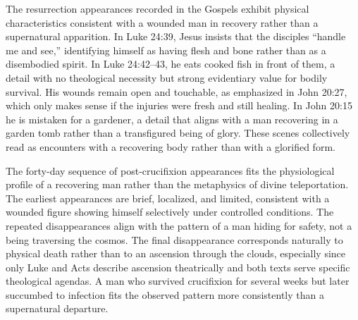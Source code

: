 The resurrection appearances recorded in the Gospels exhibit physical characteristics consistent with a wounded man in recovery rather than a supernatural apparition.
In Luke 24:39, Jesus insists that the disciples ``handle me and see,'' identifying himself as having flesh and bone rather than as a disembodied spirit.
In Luke 24:42--43, he eats cooked fish in front of them, a detail with no theological necessity but strong evidentiary value for bodily survival.
His wounds remain open and touchable, as emphasized in John 20:27, which only makes sense if the injuries were fresh and still healing.
In John 20:15 he is mistaken for a gardener, a detail that aligns with a man recovering in a garden tomb rather than a transfigured being of glory.
These scenes collectively read as encounters with a recovering body rather than with a glorified form.

The forty-day sequence of post-crucifixion appearances fits the physiological profile of a recovering man rather than the metaphysics of divine teleportation.
The earliest appearances are brief, localized, and limited, consistent with a wounded figure showing himself selectively under controlled conditions.
The repeated disappearances align with the pattern of a man hiding for safety, not a being traversing the cosmos.
The final disappearance corresponds naturally to physical death rather than to an ascension through the clouds, especially since only Luke and Acts describe ascension theatrically and both texts serve specific theological agendas.
A man who survived crucifixion for several weeks but later succumbed to infection fits the observed pattern more consistently than a supernatural departure.

